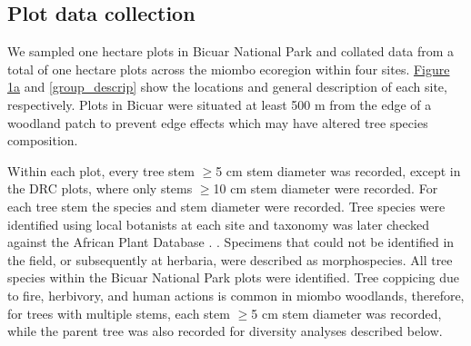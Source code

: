 \documentclass[diversity,article,submit,moreauthors,pdftex]{Definitions/mdpi}
\begin{document}

\subsection{Plot data collection}

We sampled \nplotsbicuar{} one hectare plots in Bicuar National Park and collated data from a total of \nplots{} one hectare plots across the miombo ecoregion within four sites. \hyperref[plot_map]{Figure 1a} and \autoref{group_descrip} show the locations and general description of each site, respectively. Plots in Bicuar were situated at least 500 m from the edge of a woodland patch to prevent edge effects which may have altered tree species composition.

Within each plot, every tree stem $\ge$5 cm stem diameter was recorded, except in the DRC plots, where only stems $\ge$10 cm stem diameter were recorded. For each tree stem the species and stem diameter were recorded. Tree species were identified using local botanists at each site and taxonomy was later checked against the African Plant Database \citep{APD2020}. . Specimens that could not be identified in the field, or subsequently at herbaria, were described as morphospecies. All tree species within the Bicuar National Park plots were identified. Tree coppicing due to fire, herbivory, and human actions is common in miombo woodlands, therefore, for trees with multiple stems, each stem $\ge$5 cm stem diameter was recorded, while the parent tree was also recorded for diversity analyses described below.   
\end{document}
